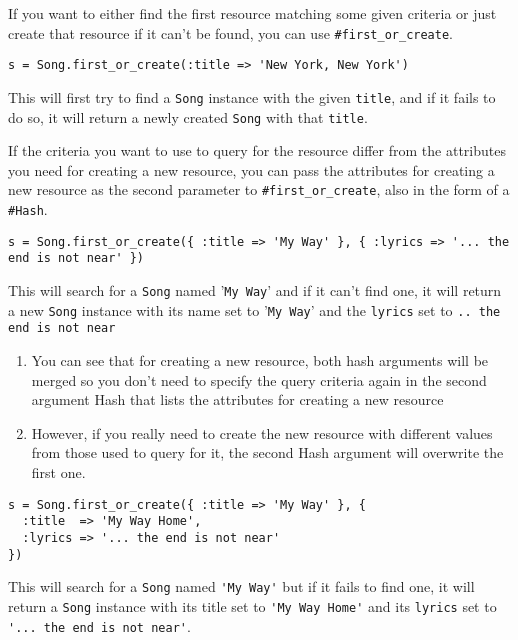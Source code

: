 If you want to either find the first resource matching some given criteria or just create that resource if it can't be found, you can use \verb|#first_or_create|.

\begin{verbatim}
s = Song.first_or_create(:title => 'New York, New York')
\end{verbatim}
This will first try to find a \verb|Song| instance with the given \verb|title|, and if it fails to do so, it will return a newly created \verb|Song| with that \verb|title|.


If the criteria you want to use to query for the resource differ from the attributes you need for creating a new resource, you can pass the attributes for creating a new resource as the second parameter to \verb|#first_or_create|, also in the form of a \verb|#Hash|.

\begin{verbatim}
s = Song.first_or_create({ :title => 'My Way' }, { :lyrics => '... the end is not near' })
\end{verbatim}

This will search for a \verb|Song| named '\verb|My Way|' and if it
can't find one, it will return a new \verb|Song| instance with its
name set to '\verb|My Way|' and the \verb|lyrics| set to 
\verb|.. the end is not near| 

\begin{enumerate}
\item You can see that for creating a new resource, both hash
arguments will be merged so you don't need to specify the query
criteria again in the second argument Hash that lists the attributes
for creating a new resource
\item However, if you really need to create the new resource with
different values from those used to query for it, the second Hash
argument will overwrite the first one.
\end{enumerate}

\begin{verbatim}
s = Song.first_or_create({ :title => 'My Way' }, {
  :title  => 'My Way Home',
  :lyrics => '... the end is not near'
})
\end{verbatim}
This will search for a \verb|Song| named 
\verb|'My Way'| but if it fails to find one, 
it will return a \verb|Song| instance with its 
title set to \verb|'My Way Home'| and its 
\verb|lyrics| set to \verb|'... the end is not near'|.


